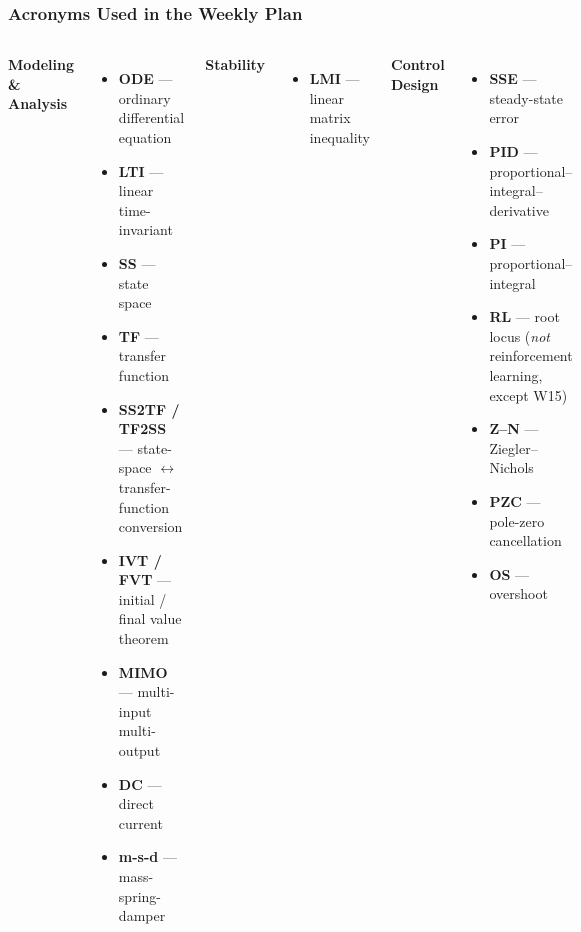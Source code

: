 \begin{frame}
\frametitle{Acronyms Used in the Weekly Plan}

\scriptsize
\begin{columns}[t]
\textbf{Modeling \& Analysis}
\begin{itemize}\setlength\itemsep{0.05cm}
    \item \textbf{ODE} --- ordinary differential equation
    \item \textbf{LTI} --- linear time-invariant
    \item \textbf{SS} --- state space
    \item \textbf{TF} --- transfer function
    \item \textbf{SS2TF / TF2SS} --- state-space $\leftrightarrow$ transfer-function conversion
    \item \textbf{IVT / FVT} --- initial / final value theorem
    \item \textbf{MIMO} --- multi-input multi-output
    \item \textbf{DC} --- direct current
    \item \textbf{m-s-d} --- mass-spring-damper
\end{itemize}

\vspace{0.15cm}
\textbf{Stability}
\begin{itemize}\setlength\itemsep{0.05cm}
    \item \textbf{LMI} --- linear matrix inequality
\end{itemize}

\textbf{Control Design}
\begin{itemize}\setlength\itemsep{0.05cm}
    \item \textbf{SSE} --- steady-state error
    \item \textbf{PID} --- proportional--integral--derivative
    \item \textbf{PI} --- proportional--integral
    \item \textbf{RL} --- root locus (\emph{not} reinforcement learning, except W15)
    \item \textbf{Z--N} --- Ziegler--Nichols
    \item \textbf{PZC} --- pole-zero cancellation
    \item \textbf{OS} --- overshoot
\end{itemize}


\end{columns}
\end{frame}
